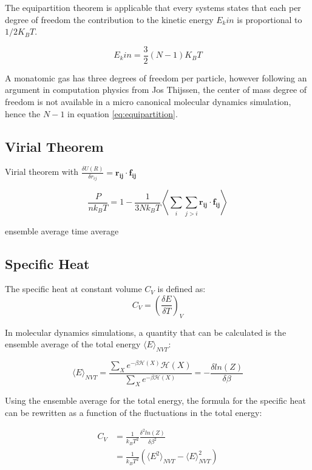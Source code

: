 \documentclass[
10pt, %
a4paper, %
oneside, %
headinclude,footinclude, %
BCOR5mm, %
]{scrartcl}
\begin{document}
The equipartition theorem is applicable that every systems  states that each per degree of freedom the contribution to the kinetic energy $E_kin$ is proportional to $1/2 K_B T$.
 
 \begin{equation} 
 \label{eq:equipartition}
 E_kin = \frac{3}{2} (N - 1) K_B T
 \end{equation}
 
A monatomic gas has three degrees of freedom per particle, 
however following an argument in computation physics from Jos Thijssen, the center of mass degree of freedom is not available in a micro canonical molecular dynamics simulation, hence the $N-1$ in equation \ref{eq:equipartition}.

\subsection{Virial Theorem}

Virial theorem with $\frac{\delta U(R)}{\delta r_{ij}} = \mathbf{r_{ij}} \cdot \mathbf{f_{ij}}$

$$ \frac{P}{nk_BT} = 1 - \frac{1}{3Nk_BT} \left \langle \sum_i \sum_{j>i} \mathbf{r_{ij}} \cdot \mathbf{f_{ij}} \right \rangle $$

ensemble average 
time average

\subsection{Specific Heat}

The specific heat at constant volume $C_V$  is defined as:
$$ C_V = \left ( \frac{\delta E}{\delta T} \right )_V $$

\noindent
In molecular dynamics simulations, a quantity that can be calculated is the ensemble average of the total energy $\langle E\rangle_{NVT}$:

$$ \langle E\rangle_{NVT} = \frac{ \sum_X e^{-\beta \mathcal{H}(X)} \mathcal{H}(X)}{ \sum_X e^{-\beta \mathcal{H}(X)}} = - \frac{\delta ln(Z)}{\delta \beta} $$

\noindent
Using the ensemble average for the total energy, the formula for the specific heat can be rewritten as a function of the fluctuations in the total energy:

\begin{align}
C_V &= \frac{1}{k_B T^2} \frac{\delta^2 ln(Z)}{\delta \beta^2} \\
&= \frac{1}{k_B T^2} \left ( \langle E^2\rangle_{NVT} - \langle E\rangle^2_{NVT} \right )
\end{align}
\end{document}
